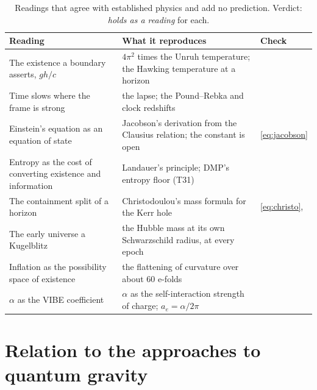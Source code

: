 \begin{table}[tb]\centering\small
\caption{Readings that agree with established physics and add no prediction. Verdict: \emph{holds as a reading} for each.}
\label{tab:readings}
\begin{tabularx}{\linewidth}{@{}lLl@{}}
\toprule
Reading & What it reproduces & Check \\
\midrule
The existence a boundary asserts, $gh/c$ & $4\pi^2$ times the Unruh temperature; the Hawking temperature at a horizon &  \\
Time slows where the frame is strong & the lapse; the Pound--Rebka and clock redshifts &  \\
Einstein's equation as an equation of state & Jacobson's derivation from the Clausius relation; the constant is open & \eqref{eq:jacobson} \\
Entropy as the cost of converting existence and information & Landauer's principle; DMP's entropy floor (T31) & \\
The containment split of a horizon & Christodoulou's mass formula for the Kerr hole & \eqref{eq:christo},  \\
The early universe a Kugelblitz & the Hubble mass at its own Schwarzschild radius, at every epoch &  \\
Inflation as the possibility space of existence & the flattening of curvature over about 60 e-folds &  \\
$\alpha$ as the VIBE coefficient & $\alpha$ as the self-interaction strength of charge; $a_e=\alpha/2\pi$ &  \\
\bottomrule
\end{tabularx}
\end{table}


\section{Relation to the approaches to quantum gravity}\label{sec:landscape}

